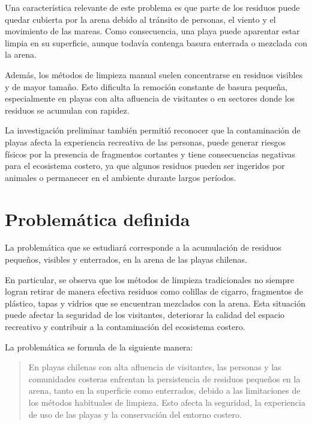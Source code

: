 \documentclass[11pt]{article}
\begin{document}
Una característica relevante de este problema es que parte de los residuos puede quedar cubierta por la arena debido al tránsito de personas, el viento y el movimiento de las mareas. Como consecuencia, una playa puede aparentar estar limpia en su superficie, aunque todavía contenga basura enterrada o mezclada con la arena.

Además, los métodos de limpieza manual suelen concentrarse en residuos visibles y de mayor tamaño. Esto dificulta la remoción constante de basura pequeña, especialmente en playas con alta afluencia de visitantes o en sectores donde los residuos se acumulan con rapidez.

La investigación preliminar también permitió reconocer que la contaminación de playas afecta la experiencia recreativa de las personas, puede generar riesgos físicos por la presencia de fragmentos cortantes y tiene consecuencias negativas para el ecosistema costero, ya que algunos residuos pueden ser ingeridos por animales o permanecer en el ambiente durante largos períodos.

\section{Problemática definida}

La problemática que se estudiará corresponde a la acumulación de residuos pequeños, visibles y enterrados, en la arena de las playas chilenas.

En particular, se observa que los métodos de limpieza tradicionales no siempre logran retirar de manera efectiva residuos como colillas de cigarro, fragmentos de plástico, tapas y vidrios que se encuentran mezclados con la arena. Esta situación puede afectar la seguridad de los visitantes, deteriorar la calidad del espacio recreativo y contribuir a la contaminación del ecosistema costero.

La problemática se formula de la siguiente manera:

\begin{quote}
En playas chilenas con alta afluencia de visitantes, las personas y las comunidades costeras enfrentan la persistencia de residuos pequeños en la arena, tanto en la superficie como enterrados, debido a las limitaciones de los métodos habituales de limpieza. Esto afecta la seguridad, la experiencia de uso de las playas y la conservación del entorno costero.
\end{quote}
\end{document}
